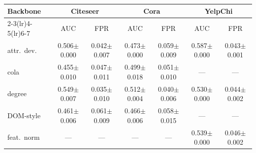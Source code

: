 \begin{tabular}{lcccccc}
\toprule
Backbone & \multicolumn{2}{c}{Citeseer} & \multicolumn{2}{c}{Cora} & \multicolumn{2}{c}{YelpChi} \\
\cmidrule(lr){2-3}\cmidrule(lr){4-5}\cmidrule(lr){6-7}
 & AUC & FPR & AUC & FPR & AUC & FPR \\
\midrule
attr.\ dev. & 0.506$\pm$0.000 & 0.042$\pm$0.007 & 0.473$\pm$0.000 & 0.059$\pm$0.009 & 0.587$\pm$0.000 & 0.043$\pm$0.001 \\
cola & 0.455$\pm$0.010 & 0.047$\pm$0.011 & 0.499$\pm$0.018 & 0.051$\pm$0.010 & --- & --- \\
degree & 0.549$\pm$0.007 & 0.035$\pm$0.010 & 0.512$\pm$0.004 & 0.040$\pm$0.006 & 0.530$\pm$0.000 & 0.044$\pm$0.002 \\
DOM-style & 0.461$\pm$0.006 & 0.061$\pm$0.009 & 0.466$\pm$0.006 & 0.058$\pm$0.015 & --- & --- \\
feat.\ norm & --- & --- & --- & --- & 0.539$\pm$0.000 & 0.046$\pm$0.002 \\
\bottomrule
\end{tabular}
